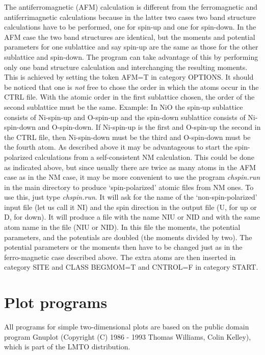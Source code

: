 \documentclass[aps,twocolumn,a4]{revtex4}
\begin{document}
The antiferromagnetic (AFM) calculation is different from the
ferromagnetic and antiferrimagnetic calculations because in the latter
two cases two band structure calculations have to be performed, one for
spin-up and one for spin-down. In the AFM case the two band structures
are identical, but the moments and potential parameters for one
sublattice and say spin-up are the same as those for the other
sublattice and spin-down. The program can take advantage of this by
performing only one band structure calculation and interchanging the
resulting moments. This is achieved by setting the token AFM=T in
category OPTIONS. It should be noticed that one is {\em not} free to
chose the order in which the atoms occur in the CTRL file. With the
atomic order in the first sublattice chosen, the order of the second
sublattice must be the same. Example: In NiO the spin-up sublattice
consists of Ni-spin-up and O-spin-up and the spin-down sublattice
consists of Ni-spin-down and O-spin-down. If Ni-spin-up is the first
and O-spin-up the second in the CTRL file, then Ni-spin-down must
be the third and O-spin-down must be the fourth atom. As described
above it may be advantageous to start the spin-polarized calculations
from a self-consistent NM calculation. This could be
done as indicated above, but since usually there are twice as many
atoms in the AFM case as in the NM case, it may be more convenient to
use the program {\em chspin.run} in the main directory to produce
`spin-polarized' atomic files from NM ones. To use
this, just type {\em chspin.run}. It will ask for the name of the
`non-spin-polarized' input file (let us call it NI) and the spin
direction in the output file (U, for up or D, for down). It will
produce a file with the name NIU or NID and with the same atom name in
the file (NIU or NID). In this file the moments, the potential
parameters, and the potentials are doubled (the moments divided by
two). The potential parameters or the moments then have to be changed
just as in the ferro-magnetic case described above. The extra atoms
are then inserted in category SITE and CLASS
BEGMOM=T and CNTROL=F in category START.



%

\section{Plot programs}
\label{plot}
All programs for simple two-dimensional plots are based on the public
domain program Gnuplot (Copyright (C) 1986 - 1993 Thomas Williams,
Colin Kelley), which is part of the LMTO distribution.
\end{document}
